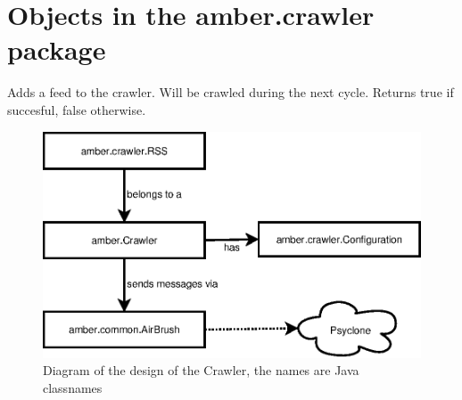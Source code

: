 \section{Objects in the amber.crawler package}


\begin{classmetadata}
\end{classmetadata}

\begin{interface}
\end{interface}




\begin{classmetadata}
\end{classmetadata}

\begin{interface}
    {Adds a feed to the crawler. Will be crawled during the next cycle. Returns
      true if succesful, false otherwise.}
\end{interface}



\begin{figure}
  \centering
  \includegraphics{image/crawler}
  \caption{
    Diagram of the design of the Crawler, the names are Java classnames
  }
\end{figure}

